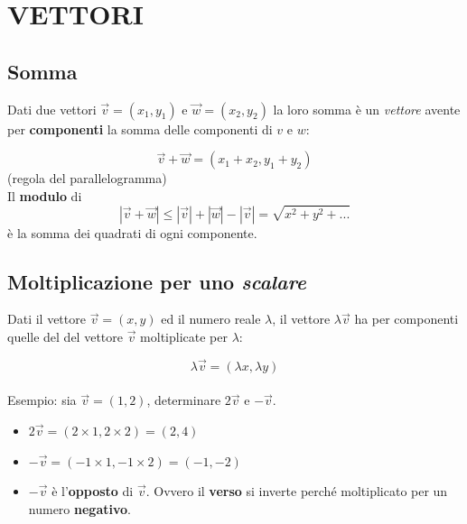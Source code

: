 \documentclass{article}
\begin{document}
\section{VETTORI}

\subsection{Somma}

Dati due vettori $\overrightarrow{v}=(x_1, y_1)$ e $\overrightarrow{w}=(x_2,y_2)$ 
la loro somma è un \textit{vettore} avente per \textbf{componenti} la somma delle componenti di $v$ e $w$:

\begin{equation}
  \overrightarrow{v}+\overrightarrow{w}=(x_1+x_2, y_1+y_2)
\end{equation} (regola del parallelogramma)\\
Il \textbf{modulo} di
\begin{equation}
  |\overrightarrow{v}+\overrightarrow{w}|\le  |\overrightarrow{v}|+|\overrightarrow{w}|
- |\overrightarrow{v}|=\sqrt{x^2+y^2+...}
\end{equation}  è la somma dei quadrati di ogni componente.

\subsection{Moltiplicazione per uno \textit{scalare}}

Dati il vettore $\overrightarrow{v}=(x,y)$ ed il numero reale $\lambda$, il vettore $\lambda\overrightarrow{v}$ ha per componenti quelle del del vettore $\overrightarrow{v}$ moltiplicate per $\lambda$:

\begin{equation*}
  \lambda\overrightarrow{v}=(\lambda x, \lambda y)
\end{equation*}\\
Esempio: sia $\overrightarrow{v}=(1,2)$, determinare $2\overrightarrow{v}$ e $-\overrightarrow{v}$.
\begin{itemize}
  \item $2\overrightarrow{v} = (2\times1,2\times2)=(2,4)$
  \item $-\overrightarrow{v} = (-1\times1,-1\times2)=(-1,-2)$
  \item $-\overrightarrow{v}$ è l'\textbf{opposto} di $\overrightarrow{v}$. Ovvero il \textbf{verso} si inverte perché moltiplicato per un numero \textbf{negativo}.
\end{itemize}
\end{document}
